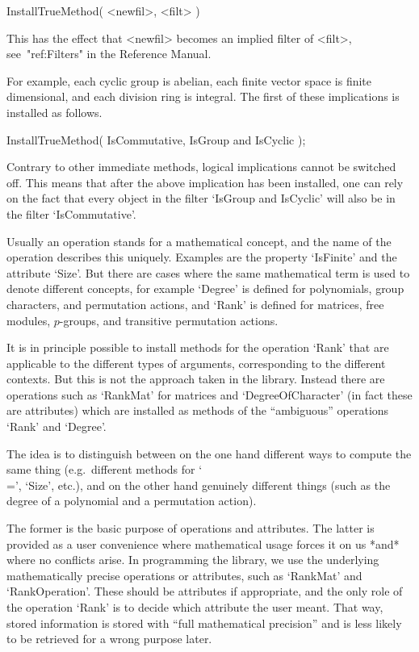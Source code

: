 \>InstallTrueMethod( <newfil>, <filt> )

This has the effect that <newfil> becomes an implied filter of <filt>,
see~"ref:Filters" in the Reference Manual.

For example, each cyclic group is abelian,
each finite vector space is finite dimensional,
and each division ring is integral.
The first of these implications is installed as follows.

\begintt
InstallTrueMethod( IsCommutative, IsGroup and IsCyclic );
\endtt

Contrary to other immediate methods,
logical implications cannot be switched off.
This means that after the above implication has been installed,
one can rely on the fact that every object in the filter
`IsGroup and IsCyclic' will also be in the filter `IsCommutative'.


Usually an operation stands for a mathematical concept,
and the name of the operation describes this uniquely.
Examples are the property `IsFinite' and the attribute `Size'.
But there are cases where the same mathematical term is used 
to denote different concepts,
for example `Degree' is defined for polynomials, group characters,
and permutation actions,
and `Rank' is defined for matrices, free modules, $p$-groups,
and transitive permutation actions.

It is in principle possible to install methods for the operation
`Rank' that are applicable to the different types of arguments,
corresponding to the different contexts.
But this is not the approach taken in the {\GAP} library.
Instead there are operations such as `RankMat' for matrices
and `DegreeOfCharacter' (in fact these are attributes)
which are installed as methods of the ``ambiguous'' operations
`Rank' and `Degree'.

The idea is to distinguish between on the one hand different ways
to compute the same thing (e.g.~different methods for `\\=', `Size', etc.),
and on the other hand genuinely different things
(such as the degree of a polynomial and a permutation action).

The former is the basic purpose of operations and attributes.
The latter is provided as a user convenience where mathematical usage
forces it on us *and* where no conflicts arise.
In programming the library, we use the underlying mathematically
precise operations or attributes, such as `RankMat' and
`RankOperation'.
These should be attributes if appropriate, and the only role of the
operation `Rank' is to decide which attribute the user meant.
That way, stored information is stored with ``full mathematical precision''
and is less likely to be retrieved for a wrong purpose later.

